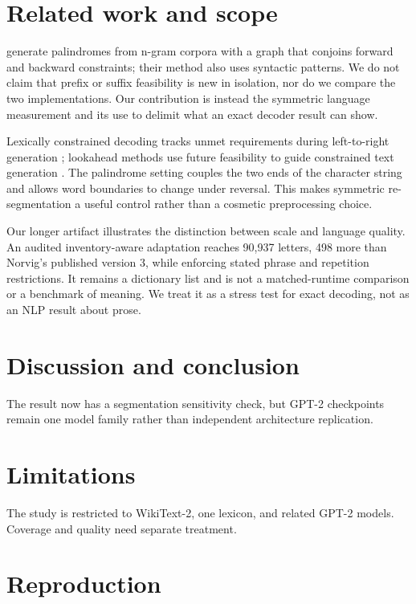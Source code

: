 \documentclass[11pt]{article}
\begin{document}
\section{Related work and scope}

\citet{papadopoulos2015palindromes} generate palindromes from n-gram corpora
with a graph that conjoins forward and backward constraints; their method also
uses syntactic patterns. We do not claim that prefix or suffix feasibility is
new in isolation, nor do we compare the two implementations. Our contribution
is instead the symmetric language measurement and its use to delimit what an
exact decoder result can show.

Lexically constrained decoding tracks unmet requirements during left-to-right
generation \citep{hokamp2017grid,post2018fast}; lookahead methods use future
feasibility to guide constrained text generation \citep{lu2022astar}. The
palindrome setting couples the two ends of the character string and allows word
boundaries to change under reversal. This makes symmetric re-segmentation a
useful control rather than a cosmetic preprocessing choice.

Our longer artifact illustrates the distinction between scale and language
quality. An audited inventory-aware adaptation reaches 90,937 letters, 498
more than Norvig's published version 3, while enforcing stated phrase and
repetition restrictions. It remains a dictionary list and is not a
matched-runtime comparison or a benchmark of meaning. We treat it as a stress
test for exact decoding, not as an NLP result about prose.

\section{Discussion and conclusion}

The result now has a segmentation sensitivity check, but GPT-2 checkpoints remain one model family rather than independent architecture replication.

\section*{Limitations}

The study is restricted to WikiText-2, one lexicon, and related GPT-2 models. Coverage and quality need separate treatment.



\appendix
\section{Reproduction}
\end{document}
